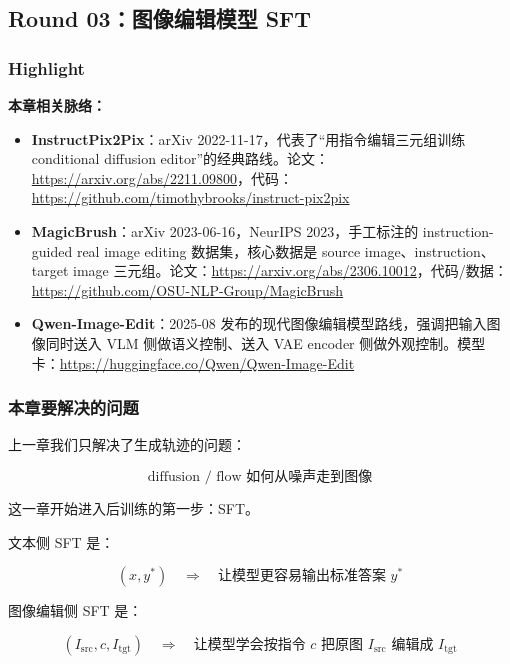 
\subsection{Round 03：图像编辑模型 SFT}

\subsubsection{Highlight}

\begin{conceptbox}
\textbf{本章相关脉络：}
\begin{itemize}[leftmargin=1.5em]
  \item \textbf{InstructPix2Pix}：arXiv 2022-11-17，代表了“用指令编辑三元组训练 conditional diffusion editor”的经典路线。论文：\url{https://arxiv.org/abs/2211.09800}，代码：\url{https://github.com/timothybrooks/instruct-pix2pix}
  \item \textbf{MagicBrush}：arXiv 2023-06-16，NeurIPS 2023，手工标注的 instruction-guided real image editing 数据集，核心数据是 source image、instruction、target image 三元组。论文：\url{https://arxiv.org/abs/2306.10012}，代码/数据：\url{https://github.com/OSU-NLP-Group/MagicBrush}
  \item \textbf{Qwen-Image-Edit}：2025-08 发布的现代图像编辑模型路线，强调把输入图像同时送入 VLM 侧做语义控制、送入 VAE encoder 侧做外观控制。模型卡：\url{https://huggingface.co/Qwen/Qwen-Image-Edit}
\end{itemize}
\end{conceptbox}

\subsubsection{本章要解决的问题}

上一章我们只解决了生成轨迹的问题：

\[
\text{diffusion / flow 如何从噪声走到图像}
\]

这一章开始进入后训练的第一步：SFT。

文本侧 SFT 是：

\[
(x,y^*)
\quad\Rightarrow\quad
\text{让模型更容易输出标准答案 } y^*
\]

图像编辑侧 SFT 是：

\[
(I_\text{src}, c, I_\text{tgt})
\quad\Rightarrow\quad
\text{让模型学会按指令 } c \text{ 把原图 } I_\text{src} \text{ 编辑成 } I_\text{tgt}
\]

